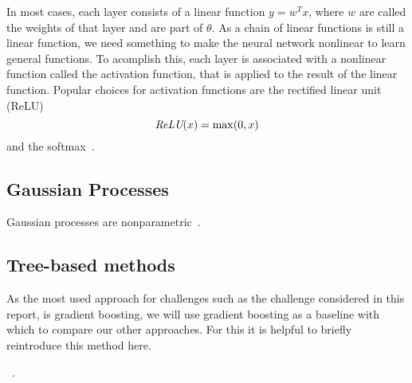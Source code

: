 In most cases, each layer consists of a linear function $y=w^T x$, where $w$
are called the weights of that layer and are part of $\theta$. As a chain of
linear functions is still a linear function, we need something to make the
neural network nonlinear to learn general functions. To acomplish this, each
layer is associated with a nonlinear function called the activation function,
that is applied to the result of the linear function. Popular choices for
activation functions are the rectified linear unit (ReLU)
\begin{equation}
    \operatorname{\textit{ReLU}}(x)=\max(0, x)
\end{equation}
and the softmax~\cite{Goodfellow-et-al-2016}. %

\subsection{Gaussian Processes}%
\label{sub:gaussian_processes}

Gaussian processes are nonparametric~\cite{barberBRML2012}.

\subsection{Tree-based methods}%
\label{sub:tree_based_methods}

As the most used approach for challenges such as the challenge considered in
this report, is gradient boosting, we will use gradient boosting as a baseline
with which to compare our other approaches. For this it is helpful to briefly
reintroduce this method here.

~\cite{hastie2009elements}.
